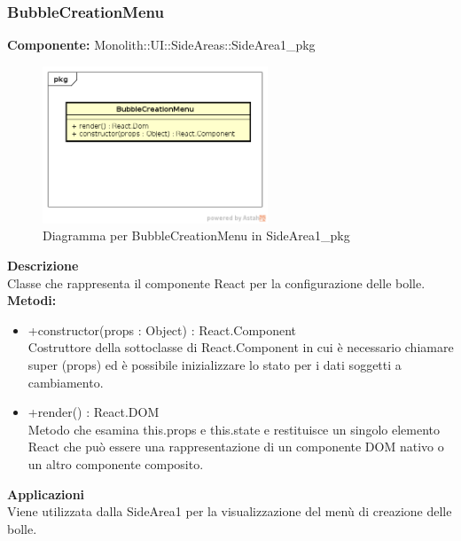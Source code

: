 \clearpage

\subsubsection{BubbleCreationMenu}
\textbf{Componente:}  Monolith::UI::SideAreas::SideArea1\_pkg\\
   \FloatBarrier
   \begin{figure}[ht]
   \centering
   \includegraphics[width=0.6\textwidth]{img/single-BubbleCreationMenu}
   \caption{{Diagramma per BubbleCreationMenu in SideArea1\_pkg}}
\end{figure}
\FloatBarrier
\textbf{Descrizione}\\
Classe che rappresenta il componente React per la configurazione delle bolle.
\textbf{Metodi:} \begin{itemize}\item +constructor(props : Object) : React.Component \\Costruttore della sottoclasse di React.Component in cui è necessario chiamare super (props) ed è possibile inizializzare lo stato per i dati soggetti a cambiamento.\item +render() : React.DOM \\Metodo che esamina this.props e this.state e restituisce un singolo elemento React che può essere una rappresentazione di un componente DOM nativo o un altro componente composito.\end{itemize} 


\textbf{Applicazioni}\\
Viene utilizzata dalla SideArea1 per la visualizzazione del menù di creazione delle bolle. 


\clearpage

